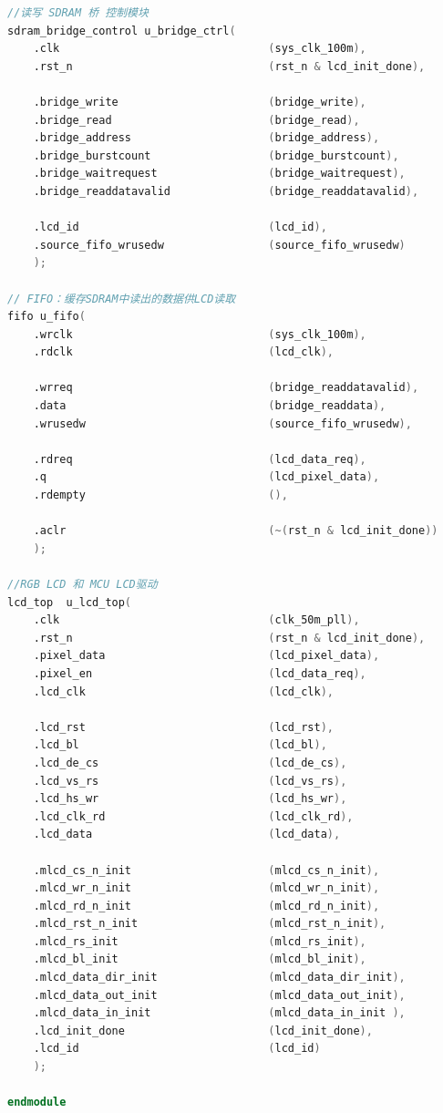 \documentclass[12pt,hyperref,a4paper,UTF8]{ctexart}
\begin{document}
\begin{lstlisting}[language=Verilog]
//读写 SDRAM 桥 控制模块
sdram_bridge_control u_bridge_ctrl(
    .clk                                (sys_clk_100m),
    .rst_n                              (rst_n & lcd_init_done),
    
    .bridge_write                       (bridge_write),
    .bridge_read                        (bridge_read),
    .bridge_address                     (bridge_address),
    .bridge_burstcount                  (bridge_burstcount), 
    .bridge_waitrequest                 (bridge_waitrequest),
    .bridge_readdatavalid               (bridge_readdatavalid),
    
    .lcd_id                             (lcd_id),
    .source_fifo_wrusedw                (source_fifo_wrusedw)
    );

// FIFO：缓存SDRAM中读出的数据供LCD读取
fifo u_fifo(
    .wrclk                              (sys_clk_100m),
    .rdclk                              (lcd_clk),
                        
    .wrreq                              (bridge_readdatavalid),
    .data                               (bridge_readdata),
    .wrusedw                            (source_fifo_wrusedw),
                        
    .rdreq                              (lcd_data_req),
    .q                                  (lcd_pixel_data),
    .rdempty                            (),
                        
    .aclr                               (~(rst_n & lcd_init_done))
    );

//RGB LCD 和 MCU LCD驱动
lcd_top  u_lcd_top(
    .clk                                (clk_50m_pll),
    .rst_n                              (rst_n & lcd_init_done),
    .pixel_data                         (lcd_pixel_data),
    .pixel_en                           (lcd_data_req),
    .lcd_clk                            (lcd_clk),

    .lcd_rst                            (lcd_rst),
    .lcd_bl                             (lcd_bl),
    .lcd_de_cs                          (lcd_de_cs),
    .lcd_vs_rs                          (lcd_vs_rs),
    .lcd_hs_wr                          (lcd_hs_wr),
    .lcd_clk_rd                         (lcd_clk_rd),
    .lcd_data                           (lcd_data),
                
    .mlcd_cs_n_init                     (mlcd_cs_n_init),
    .mlcd_wr_n_init                     (mlcd_wr_n_init),
    .mlcd_rd_n_init                     (mlcd_rd_n_init),
    .mlcd_rst_n_init                    (mlcd_rst_n_init),
    .mlcd_rs_init                       (mlcd_rs_init),
    .mlcd_bl_init                       (mlcd_bl_init),
    .mlcd_data_dir_init                 (mlcd_data_dir_init),
    .mlcd_data_out_init                 (mlcd_data_out_init),
    .mlcd_data_in_init                  (mlcd_data_in_init ),
    .lcd_init_done                      (lcd_init_done),
    .lcd_id                             (lcd_id)
    );

endmodule 


\end{lstlisting}
\end{document}
